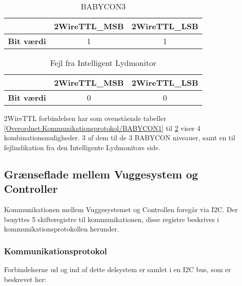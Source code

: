 \begin{table}[H]
	\caption{BABYCON3 }
	\centering
	\begin{tabular}{|l|c|c|}
		\hline 
			&\textbf{2WireTTL\_MSB} & \textbf{2WireTTL\_LSB}     \\ 
		\hline 
		\textbf{Bit værdi} &1 & 1     \\ 
		\hline
	\end{tabular} 
	\label{Overordnet:Kommunikationsprotokol/BABYCON3}
\end{table}


\begin{table}[H]
	\caption{Fejl fra Intelligent Lydmonitor }
	\centering
	\begin{tabular}{|l|c|c|}
		\hline 
			&\textbf{2WireTTL\_MSB} & \textbf{2WireTTL\_LSB}     \\ 
		\hline 
		\textbf{Bit værdi} &0 & 0     \\ 
		\hline
	\end{tabular} 
	\label{Overordnet:Kommunikationsprotokol/IL_fejl}
\end{table}


2WireTTL forbindelsen har som ovenstående tabeller \ref{Overordnet:Kommunikationsprotokol/BABYCON1} til \ref{Overordnet:Kommunikationsprotokol/IL_fejl} viser 4 kombinationsmuligheder. 3 af dem til de 3 BABYCON niveauer, samt en til fejlindikation fra den Intelligente Lydmonitors side. 


\subsection{Grænseflade mellem Vuggesystem og Controller}
Kommunikationen mellem Vuggesystemet og Controllen foregår via I2C. Der benyttes 5 skifteregistre til kommunikationen, disse registre beskrives i kommunikationsprotokollen herunder.

\subsubsection{Kommunikationsprotokol}
Forbindelserne ud og ind af dette delsystem er samlet i en I2C bus, som er beskrevet her:

